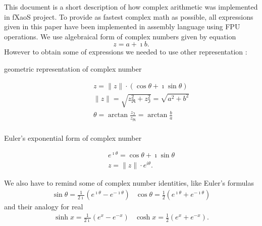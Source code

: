 \documentclass[11pt,a4paper,openany,oneside]{extreport}
\author{mateusz}
\begin{document}
\titlepage

This document is a short description of how complex arithmetic was implemented in fXaoS project. To provide 
as fastest complex math as possible, all expressions given in this paper have been implemented in assembly language using 
FPU operations. We use algebraical form of complex numbers given by equation
\begin{equation} 
z = a + \imath b \label{eq:cnalgebra}\text{.}
\end{equation}
However to obtain some of expressions we needed to use other representation :

\begin{description} 
\item[geometric representation of complex number]
 \begin{displaymath}
  \begin{array}{l}
  z = \|z\| \cdot \left( \cos\theta + \imath \sin\theta \right) \\
  \|z\| = \sqrt{z_\Re^2+z_\Im^2}=\sqrt{a^2+b^2} \\
  \theta = \arctan{\frac{z_\Im}{z_\Re}}=\arctan{\frac{b}{a}}\\
  \end{array}
 \end{displaymath}
\item[Euler's exponential form of complex number]
 \begin{displaymath}
  \begin{array}{l}
  e^{\imath\theta} = \cos\theta + \imath \sin\theta \\
  z = \|z\|\cdot e^{i\theta} \text{.}  
  \end{array}
 \end{displaymath}
\end{description}

We also have to remind some of complex number identities, like Euler's formulas
\begin{equation} 
 \begin{array}{rl}
   \sin{\theta} = \frac{1}{2\imath}\left( e^{\imath \theta}-e^{-\imath \theta} \right) &
   \cos{\theta} = \frac{1}{2}\left( e^{\imath \theta}+e^{-\imath \theta} \right)
 \end{array}
 \end{equation}
and their analogy for real
 \begin{equation}
  \begin{array}{rl}
  \sinh{x} = \frac{1}{2\imath}\left( e^{x}-e^{-x} \right) &
  \cosh{x} = \frac{1}{2}\left( e^{x}+e^{-x} \right) \text{.}
  \end{array}
 \end{equation}
\end{document}
